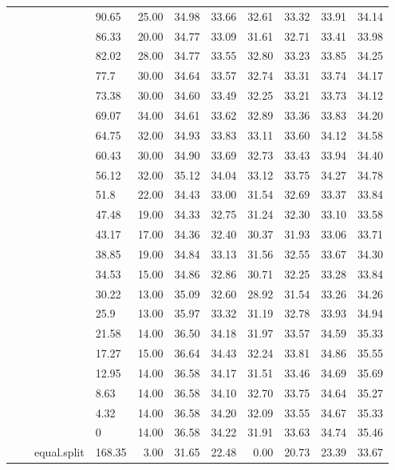 \begin{longtable}{llllrrrrrrr}
   &  &  & 90.65 & 25.00 & 34.98 & 33.66 & 32.61 & 33.32 & 33.91 & 34.14 \\ 
   &  &  & 86.33 & 20.00 & 34.77 & 33.09 & 31.61 & 32.71 & 33.41 & 33.98 \\ 
   &  &  & 82.02 & 28.00 & 34.77 & 33.55 & 32.80 & 33.23 & 33.85 & 34.25 \\ 
   &  &  & 77.7 & 30.00 & 34.64 & 33.57 & 32.74 & 33.31 & 33.74 & 34.17 \\ 
   &  &  & 73.38 & 30.00 & 34.60 & 33.49 & 32.25 & 33.21 & 33.73 & 34.12 \\ 
   &  &  & 69.07 & 34.00 & 34.61 & 33.62 & 32.89 & 33.36 & 33.83 & 34.20 \\ 
   &  &  & 64.75 & 32.00 & 34.93 & 33.83 & 33.11 & 33.60 & 34.12 & 34.58 \\ 
   &  &  & 60.43 & 30.00 & 34.90 & 33.69 & 32.73 & 33.43 & 33.94 & 34.40 \\ 
   &  &  & 56.12 & 32.00 & 35.12 & 34.04 & 33.12 & 33.75 & 34.27 & 34.78 \\ 
   &  &  & 51.8 & 22.00 & 34.43 & 33.00 & 31.54 & 32.69 & 33.37 & 33.84 \\ 
   &  &  & 47.48 & 19.00 & 34.33 & 32.75 & 31.24 & 32.30 & 33.10 & 33.58 \\ 
   &  &  & 43.17 & 17.00 & 34.36 & 32.40 & 30.37 & 31.93 & 33.06 & 33.71 \\ 
   &  &  & 38.85 & 19.00 & 34.84 & 33.13 & 31.56 & 32.55 & 33.67 & 34.30 \\ 
   &  &  & 34.53 & 15.00 & 34.86 & 32.86 & 30.71 & 32.25 & 33.28 & 33.84 \\ 
   &  &  & 30.22 & 13.00 & 35.09 & 32.60 & 28.92 & 31.54 & 33.26 & 34.26 \\ 
   &  &  & 25.9 & 13.00 & 35.97 & 33.32 & 31.19 & 32.78 & 33.93 & 34.94 \\ 
   &  &  & 21.58 & 14.00 & 36.50 & 34.18 & 31.97 & 33.57 & 34.59 & 35.33 \\ 
   &  &  & 17.27 & 15.00 & 36.64 & 34.43 & 32.24 & 33.81 & 34.86 & 35.55 \\ 
   &  &  & 12.95 & 14.00 & 36.58 & 34.17 & 31.51 & 33.46 & 34.69 & 35.69 \\ 
   &  &  & 8.63 & 14.00 & 36.58 & 34.10 & 32.70 & 33.75 & 34.64 & 35.27 \\ 
   &  &  & 4.32 & 14.00 & 36.58 & 34.20 & 32.09 & 33.55 & 34.67 & 35.33 \\ 
   &  &  & 0 & 14.00 & 36.58 & 34.22 & 31.91 & 33.63 & 34.74 & 35.46 \\ 
   &  & equal.split & 168.35 & 3.00 & 31.65 & 22.48 & 0.00 & 20.73 & 23.39 & 33.67 \\ 

\end{longtable}
